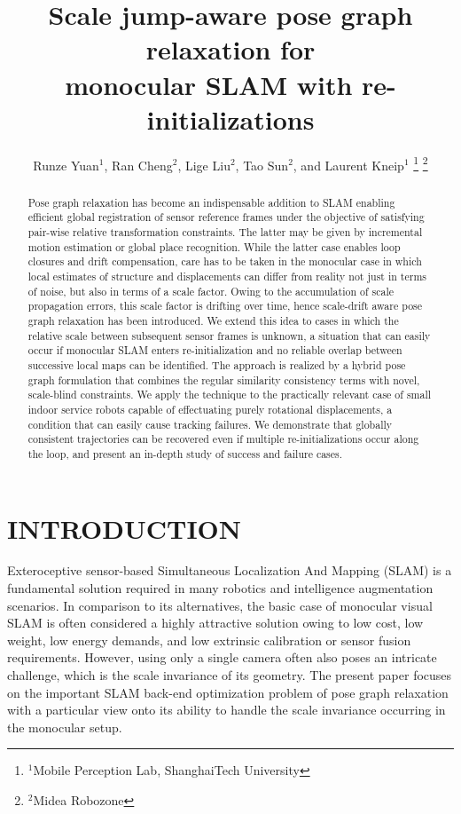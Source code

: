 \documentclass[letterpaper, 10 pt, conference]{ieeeconf}  %
\title{\LARGE \bf Scale jump-aware pose graph relaxation for\\monocular SLAM with re-initializations}
\author{Runze Yuan$^{1}$, Ran Cheng$^{2}$, Lige Liu$^{2}$, Tao Sun$^{2}$, and Laurent Kneip$^{1}$%
\thanks{$^{1}$Mobile Perception Lab, ShanghaiTech University}%
\thanks{$^{2}$Midea Robozone}%
}
\begin{document}
\maketitle
\thispagestyle{empty}
\pagestyle{empty}


\begin{abstract}
Pose graph relaxation has become an indispensable addition to SLAM enabling efficient global registration of sensor reference frames under the objective of satisfying pair-wise relative transformation constraints. The latter may be given by incremental motion estimation or global place recognition. While the latter case enables loop closures and drift compensation, care has to be taken in the monocular case in which local estimates of structure and displacements can differ from reality not just in terms of noise, but also in terms of a scale factor. Owing to the accumulation of scale propagation errors, this scale factor is drifting over time, hence scale-drift aware pose graph relaxation has been introduced. We extend this idea to cases in which the relative scale between subsequent sensor frames is unknown, a situation that can easily occur if monocular SLAM enters re-initialization and no reliable overlap between successive local maps can be identified. The approach is realized by a hybrid pose graph formulation that combines the regular similarity consistency terms with novel, scale-blind constraints. We apply the technique to the practically relevant case of small indoor service robots capable of effectuating purely rotational displacements, a condition that can easily cause tracking failures. We demonstrate that globally consistent trajectories can be recovered even if multiple re-initializations occur along the loop, and present an in-depth study of success and failure cases.
\end{abstract}


\section{INTRODUCTION}

Exteroceptive sensor-based Simultaneous Localization And Mapping (SLAM) is a fundamental solution required in many robotics and intelligence augmentation scenarios. In comparison to its alternatives, the basic case of monocular visual SLAM is often considered a highly attractive solution owing to low cost, low weight, low energy demands, and low extrinsic calibration or sensor fusion requirements. However, using only a single camera often also poses an intricate challenge, which is the scale invariance of its geometry. The present paper focuses on the important SLAM back-end optimization problem of pose graph relaxation with a particular view onto its ability to handle the scale invariance occurring in the monocular setup.
\end{document}

